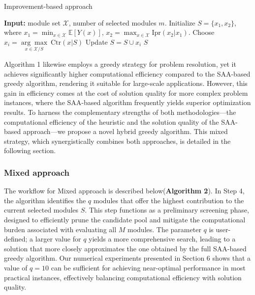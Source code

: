\documentclass[opre,sglanonrev]{informs4}
\begin{document}
\begin{algorithm}
\caption{Improvement-based approach} %
\label{alg:improvement} %
\begin{algorithmic}[1] %
\State \textbf{Input:} module set $\mathcal{X}$, number of selected modules $m$.
\State Initialize $S = \{x_1,x_2\}$, where $x_1 = \min_{x\in \mathcal{X}} \mathbb{E}[Y(x)]$, $x_2 = \max_{x\in \mathcal{X}} \text{Ipr}(x_2|x_1)$.
    \State Choose $x_i = \underset{x\in \mathcal{X}/S}{{\arg\max}}~\text{Ctr}(x|S)$
    \State Update $S = S \cup x_i$
\EndFor
\State \Return $S$
\end{algorithmic}
\end{algorithm}
Algorithm 1 likewise employs a greedy strategy for problem resolution, yet it achieves significantly higher computational efficiency compared to the SAA-based greedy algorithm, rendering it suitable for large-scale applications. However, this gain in efficiency comes at the cost of solution quality for more complex problem instances, where the SAA-based algorithm frequently yields superior optimization results. To harness the complementary strengths of both methodologies---the computational efficiency of the heuristic and the solution quality of the SAA-based approach---we propose a novel hybrid greedy algorithm. This mixed strategy, which synergistically combines both approaches, is detailed in the following section.

\subsubsection{Mixed approach}
The workflow for Mixed approach is described below(\textbf{Algorithm 2}). In Step 4, the algorithm identifies the $q$ modules that offer the highest contribution to the current selected modules $S$. This step functions as a preliminary screening phase, designed to efficiently prune the candidate pool and mitigate the computational burden associated with evaluating all $M$ modules. The parameter $q$ is user-defined; a larger value for $q$ yields a more comprehensive search, leading to a solution that more closely approximates the one obtained by the full SAA-based greedy algorithm. Our numerical experiments presented in Section 6 shows that a value of $q=10$ can be sufficient for achieving near-optimal performance in most practical instances, effectively balancing computational efficiency with solution quality.
\end{document}
